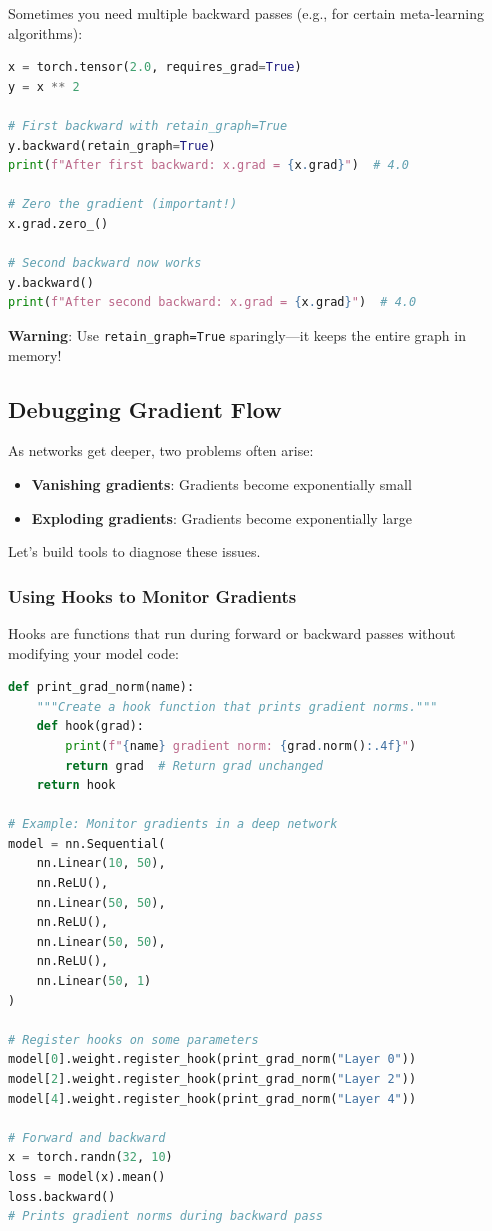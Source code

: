 \documentclass{article}
\begin{document}
Sometimes you need multiple backward passes (e.g., for certain meta-learning algorithms):

\begin{lstlisting}[language=Python]
x = torch.tensor(2.0, requires_grad=True)
y = x ** 2

# First backward with retain_graph=True
y.backward(retain_graph=True)
print(f"After first backward: x.grad = {x.grad}")  # 4.0

# Zero the gradient (important!)
x.grad.zero_()

# Second backward now works
y.backward()
print(f"After second backward: x.grad = {x.grad}")  # 4.0
\end{lstlisting}

\textbf{Warning}: Use \texttt{retain\_graph=True} sparingly—it keeps the entire graph in memory!

\subsection{Debugging Gradient Flow}

As networks get deeper, two problems often arise:
\begin{itemize}
    \item \textbf{Vanishing gradients}: Gradients become exponentially small
    \item \textbf{Exploding gradients}: Gradients become exponentially large
\end{itemize}

Let's build tools to diagnose these issues.

\subsubsection{Using Hooks to Monitor Gradients}

Hooks are functions that run during forward or backward passes without modifying your model code:

\begin{lstlisting}[language=Python]
def print_grad_norm(name):
    """Create a hook function that prints gradient norms."""
    def hook(grad):
        print(f"{name} gradient norm: {grad.norm():.4f}")
        return grad  # Return grad unchanged
    return hook

# Example: Monitor gradients in a deep network
model = nn.Sequential(
    nn.Linear(10, 50),
    nn.ReLU(),
    nn.Linear(50, 50),
    nn.ReLU(),
    nn.Linear(50, 50),
    nn.ReLU(),
    nn.Linear(50, 1)
)

# Register hooks on some parameters
model[0].weight.register_hook(print_grad_norm("Layer 0"))
model[2].weight.register_hook(print_grad_norm("Layer 2"))
model[4].weight.register_hook(print_grad_norm("Layer 4"))

# Forward and backward
x = torch.randn(32, 10)
loss = model(x).mean()
loss.backward()
# Prints gradient norms during backward pass
\end{lstlisting}
\end{document}
